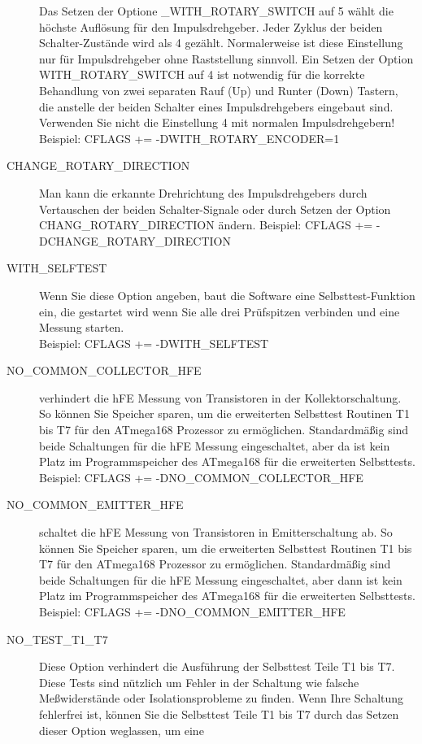 \begin{description}
Das Setzen der Optione \_WITH\_ROTARY\_SWITCH auf 5 wählt die höchste Auflösung für den Impulsdrehgeber.
Jeder Zyklus der beiden Schalter-Zustände wird als 4 gezählt. Normalerweise ist diese Einstellung nur für
Impulsdrehgeber ohne Raststellung sinnvoll.
Ein Setzen der Option WITH\_ROTARY\_SWITCH auf 4 ist notwendig für die korrekte Behandlung von zwei separaten
Rauf (Up) und Runter (Down) Tastern, die anstelle der beiden Schalter eines Impulsdrehgebers eingebaut sind.
Verwenden Sie nicht die Einstellung 4 mit normalen Impulsdrehgebern!\\
Beispiel: CFLAGS += -DWITH\_ROTARY\_ENCODER=1
  \item[CHANGE\_ROTARY\_DIRECTION] Man kann die erkannte Drehrichtung des Impulsdrehgebers durch Vertauschen
der beiden Schalter-Signale oder durch Setzen der Option CHANG\_ROTARY\_DIRECTION ändern.
Beispiel: CFLAGS += -DCHANGE\_ROTARY\_DIRECTION
 \item[WITH\_SELFTEST] Wenn Sie diese Option angeben, baut die Software eine Selbsttest-Funktion ein, die gestartet wird
wenn Sie alle drei Prüfspitzen verbinden und eine Messung starten.\\
Beispiel: CFLAGS += -DWITH\_SELFTEST
  \item[NO\_COMMON\_COLLECTOR\_HFE] verhindert die hFE Messung von Transistoren in der Kollektorschaltung.
So können Sie Speicher sparen, um die erweiterten Selbsttest Routinen T1 bis T7 für den ATmega168 Prozessor zu ermöglichen.
Standardmäßig sind beide Schaltungen für die hFE Messung eingeschaltet,
aber da ist kein Platz im Programmspeicher des ATmega168 für die erweiterten Selbsttests.\\
Beispiel: CFLAGS += -DNO\_COMMON\_COLLECTOR\_HFE
  \item[NO\_COMMON\_EMITTER\_HFE] schaltet die hFE Messung von Transistoren in Emitterschaltung ab.
So können Sie Speicher sparen, um die erweiterten Selbsttest Routinen T1 bis T7 für den ATmega168 Prozessor zu ermöglichen.
Standardmäßig sind beide Schaltungen für die hFE Messung eingeschaltet,
aber dann ist kein Platz im Programmspeicher des ATmega168 für die erweiterten Selbsttests.\\
Beispiel: CFLAGS += -DNO\_COMMON\_EMITTER\_HFE
  \item[NO\_TEST\_T1\_T7] Diese Option verhindert die Ausführung der Selbsttest Teile T1 bis T7.
Diese Tests sind nützlich um Fehler in der Schaltung wie falsche Meßwiderstände oder Isolationsprobleme zu finden.
Wenn Ihre Schaltung fehlerfrei ist, können Sie die Selbsttest Teile T1 bis T7 durch das Setzen dieser Option weglassen, um eine

\end{description}
